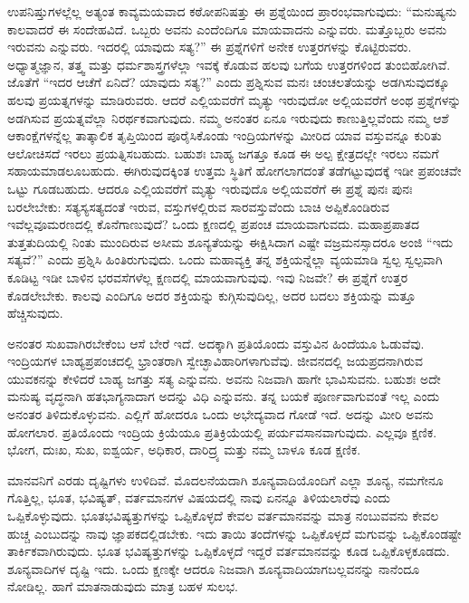ಉಪನಿಷ್ತುಗಳಲ್ಲೆಲ್ಲ ಅತ್ಯಂತ ಕಾವ್ಯಮಯವಾದ ಕಠೋಪನಿಷತ್ತು ಈ ಪ್ರಶ್ನೆಯಿಂದ ಪ್ರಾರಂಭವಾಗುವುದು: “ಮನುಷ್ಯನು ಕಾಲವಾದರೆ ಈ ಸಂದೇಹವಿದೆ. ಒಬ್ಬರು ಅವನು ಎಂದೆಂದಿಗೂ ಮಾಯವಾದನು ಎನ್ನುವರು. ಮತ್ತೊಬ್ಬರು ಅವನು ಇರುವನು ಎನ್ನುವರು. ಇದರಲ್ಲಿ ಯಾವುದು ಸತ್ಯ?” ಈ ಪ್ರಶ್ನೆಗಳಿಗೆ ಅನೇಕ ಉತ್ತರಗಳನ್ನು ಕೊಟ್ಟಿರುವರು. ಅಧ್ಯಾತ್ಮಜ್ಞಾನ, ತತ್ತ್ವ ಮತ್ತು ಧರ್ಮಶಾಸ್ತ್ರಗಳೆಲ್ಲಾ ಇವಕ್ಕೆ ಕೊಡುವ ಹಲವು ಬಗೆಯ ಉತ್ತರಗಳಿಂದ ತುಂಬಿಹೋಗಿವೆ. ಜೊತೆಗೆ “ಇದರ ಆಚೆಗೆ ಏನಿದೆ? ಯಾವುದು ಸತ್ಯ?” ಎಂದು ಪ್ರಶ್ನಿಸುವ ಮನಃ ಚಂಚಲತೆಯನ್ನು ಅಡಗಿಸುವುದಕ್ಕೂ ಹಲವು ಪ್ರಯತ್ನಗಳನ್ನು ಮಾಡಿರುವರು. ಆದರೆ ಎಲ್ಲಿಯವರೆಗೆ ಮೃತ್ಯು ಇರುವುದೋ ಅಲ್ಲಿಯವರೆಗೆ ಅಂಥ ಪ್ರಶ್ನೆಗಳನ್ನು ಅಡಗಿಸುವ ಪ್ರಯತ್ನವೆಲ್ಲಾ ನಿರರ್ಥಕವಾಗುವುದು. ನಮ್ಮ ಅನಂತರ ಏನೂ ಇರುವುದು ಕಾಣುತ್ತಿಲ್ಲವೆಂದು ನಮ್ಮ ಆಶೆ ಆಕಾಂಕ್ಷೆಗಳನ್ನೆಲ್ಲ ತಾತ್ಕಾಲಿಕ ತೃಪ್ತಿಯಿಂದ ಪೂರೈಸಿಕೊಂಡು ಇಂದ್ರಿಯಗಳನ್ನು ಮೀರಿದ ಯಾವ ವಸ್ತುವನ್ನೂ ಕುರಿತು ಆಲೋಚಿಸದೆ ಇರಲು ಪ್ರಯತ್ನಿಸಬಹುದು. ಬಹುಶಃ ಬಾಹ್ಯ ಜಗತ್ತೂ ಕೂಡ ಈ ಅಲ್ಪ ಕ್ಷೇತ್ರದಲ್ಲೇ ಇರಲು ನಮಗೆ ಸಹಾಯಮಾಡಲೂಬಹುದು. ಈಗಿರುವುದಕ್ಕಿಂತ ಉತ್ತಮ ಸ್ಥಿತಿಗೆ ಹೋಗಲಾಗದಂತೆ ತಡೆಗಟ್ಟುವುದಕ್ಕೆ ಇಡೀ ಪ್ರಪಂಚವೇ ಒಟ್ಟು ಗೂಡಬಹುದು. ಆದರೂ ಎಲ್ಲಿಯವರೆಗೆ ಮೃತ್ಯು ಇರುವುದೊ ಅಲ್ಲಿಯವರೆಗೆ ಈ ಪ್ರಶ್ನೆ ಪುನಃ ಪುನಃ ಬರಲೇಬೇಕು: ಸತ್ಯಸ್ಯಸತ್ಯದಂತೆ ಇರುವ, ವಸ್ತುಗಳಲ್ಲಿರುವ ಸಾರವಸ್ತುವೆಂದು ಬಾಚಿ ಅಪ್ಪಿಕೊಂಡಿರುವ ಇವೆಲ್ಲವೂ\break ಮರಣದಲ್ಲಿ ಕೊನೆಗಾಣುವುದೆ? ಒಂದು ಕ್ಷಣದಲ್ಲಿ ಪ್ರಪಂಚ ಮಾಯವಾಗುವದು. ಮಹಾಪ್ರಪಾತದ ತುತ್ತತುದಿಯಲ್ಲಿ ನಿಂತು ಮುಂದಿರುವ ಅಸೀಮ ಶೂನ್ಯತೆಯನ್ನು ಈಕ್ಷಿಸಿದಾಗ ಎಷ್ಟೇ ವಜ್ರಮನಸ್ಸಾದರೂ ಅಂಜಿ “ಇದು ಸತ್ಯವೆ?” ಎಂದು ಪ್ರಶ್ನಿಸಿ ಹಿಂತಿರುಗುವುದು. ಒಂದು ಮಹಾವ್ಯಕ್ತಿ ತನ್ನ ಶಕ್ತಿಯನ್ನೆಲ್ಲಾ ವ್ಯಯಮಾಡಿ ಸ್ವಲ್ಪ ಸ್ವಲ್ಪವಾಗಿ ಕೂಡಿಟ್ಟ ಇಡೀ ಬಾಳಿನ ಭರವಸೆಗಳೆಲ್ಲ ಕ್ಷಣದಲ್ಲಿ ಮಾಯವಾಗುವುವು. ಇವು ನಿಜವೇ? ಈ ಪ್ರಶ್ನೆಗೆ ಉತ್ತರ ಕೊಡಲೇಬೇಕು. ಕಾಲವು ಎಂದಿಗೂ ಅದರ ಶಕ್ತಿಯನ್ನು ಕುಗ್ಗಿಸುವುದಿಲ್ಲ, ಅದರ ಬದಲು ಶಕ್ತಿಯನ್ನು ಮತ್ತೂ ಹೆಚ್ಚಿಸುವುದು.

ಅನಂತರ ಸುಖವಾಗಿರಬೇಕೆಂಬ ಆಸೆ ಬೇರೆ ಇದೆ. ಅದಕ್ಕಾಗಿ ಪ್ರತಿಯೊಂದು ವಸ್ತುವಿನ ಹಿಂದೆಯೂ ಓಡುವೆವು. ಇಂದ್ರಿಯಗಳ ಬಾಹ್ಯಪ್ರಪಂಚದಲ್ಲಿ ಭ್ರಾಂತರಾಗಿ ಸ್ವೇಚ್ಛಾವಿಹಾರಿಗಳಾಗುವೆವು. ಜೀವನದಲ್ಲಿ ಜಯಪ್ರದನಾಗಿರುವ ಯುವಕನನ್ನು ಕೇಳಿದರೆ ಬಾಹ್ಯ ಜಗತ್ತು ಸತ್ಯ ಎನ್ನುವನು. ಅವನು ನಿಜವಾಗಿ ಹಾಗೇ ಭಾವಿಸುವನು. ಬಹುಶಃ ಅದೇ ಮನುಷ್ಯ ವೃದ್ಧನಾಗಿ ಹತಭಾಗ್ಯನಾದಾಗ ಅದನ್ನು ವಿಧಿ ಎನ್ನುವನು. ತನ್ನ ಬಯಕೆ ಪೂರ್ಣವಾಗುವಂತೆ ಇಲ್ಲ ಎಂದು ಅನಂತರ ತಿಳಿದುಕೊಳ್ಳುವನು. ಎಲ್ಲಿಗೆ ಹೋದರೂ ಒಂದು ಅಭೇದ್ಯವಾದ ಗೋಡೆ ಇದೆ. ಅದನ್ನು ಮೀರಿ ಅವನು ಹೋಗಲಾರ. ಪ್ರತಿಯೊಂದು ಇಂದ್ರಿಯ ಕ್ರಿಯೆಯೂ ಪ್ರತಿಕ್ರಿಯೆಯಲ್ಲಿ ಪರ್ಯವಸಾನವಾಗುವುದು. ಎಲ್ಲವೂ ಕ್ಷಣಿಕ. ಭೋಗ, ದುಃಖ, ಸುಖ, ಐಶ್ವರ್ಯ, ಅಧಿಕಾರ, ದಾರಿದ್ರ್ಯ ಮತ್ತು ನಮ್ಮ ಬಾಳೂ ಕೂಡ ಕ್ಷಣಿಕ.

ಮಾನವನಿಗೆ ಎರಡು ದೃಷ್ಟಿಗಳು ಉಳಿದಿವೆ. ಮೊದಲನೆಯದಾಗಿ ಶೂನ್ಯವಾದಿ\break ಯೊಂದಿಗೆ ಎಲ್ಲಾ ಶೂನ್ಯ, ನಮಗೇನೂ ಗೊತ್ತಿಲ್ಲ, ಭೂತ, ಭವಿಷ್ಯತ್​, ವರ್ತಮಾನಗಳ ವಿಷಯದಲ್ಲಿ ನಾವು ಏನನ್ನೂ ತಿಳಿಯಲಾರೆವು ಎಂದು ಒಪ್ಪಿಕೊಳ್ಳುವುದು. ಭೂತಭವಿಷ್ಯತ್ತುಗಳನ್ನು ಒಪ್ಪಿಕೊಳ್ಳದೆ ಕೇವಲ ವರ್ತಮಾನವನ್ನು ಮಾತ್ರ ನಂಬುವವನು ಕೇವಲ ಹುಚ್ಚ ಎಂಬುದನ್ನು ನಾವು ಜ್ಞಾಪಕದಲ್ಲಿಡಬೇಕು. ಇದು ತಾಯಿ ತಂದೆಗಳನ್ನು ಒಪ್ಪಿಕೊಳ್ಳದೆ ಮಗುವನ್ನು ಒಪ್ಪಿಕೊಂಡಷ್ಟೇ ತಾರ್ಕಿಕವಾಗಿರುವುದು. ಭೂತ ಭವಿಷ್ಯತ್ತುಗಳನ್ನು ಒಪ್ಪಿಕೊಳ್ಳದೆ ಇದ್ದರೆ ವರ್ತಮಾನವನ್ನು ಕೂಡ ಒಪ್ಪಿಕೊಳ್ಳಕೂಡದು. ಶೂನ್ಯವಾದಿಗಳ ದೃಷ್ಟಿ ಇದು. ಒಂದು ಕ್ಷಣಕ್ಕೇ ಆದರೂ ನಿಜವಾಗಿ ಶೂನ್ಯವಾದಿಯಾಗಬಲ್ಲವನನ್ನು ನಾನೆಂದೂ ನೋಡಿಲ್ಲ. ಹಾಗೆ ಮಾತನಾಡುವುದು ಮಾತ್ರ ಬಹಳ ಸುಲಭ.


